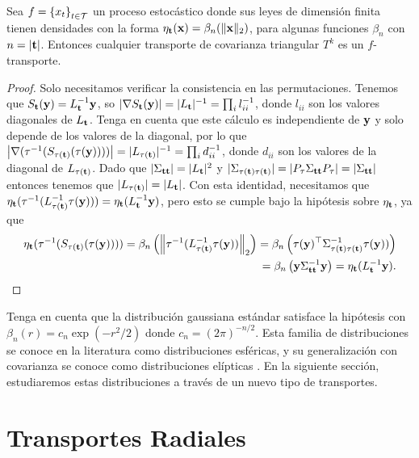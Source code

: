 \begin{proposition}
	Sea \(f=\left\{ x_{t}\right\} _{t\in \mathcal{T}}\) un proceso estocástico donde sus leyes de dimensión finita tienen densidades con la forma \(\eta_{\mathbf{t}}(\mathbf{x} ) = \beta_n(\lVert \mathbf{x} \rVert_2)\), para algunas funciones \(\beta_n\) con \(n = |\mathbf{t}|\). Entonces cualquier transporte de covarianza triangular \(T^k\) es un \(f\)-transporte.
	\begin{proof}
		Solo necesitamos verificar la consistencia en las permutaciones. Tenemos que \(S_{\mathbf{t}}(\mathbf{y})=L_{\mathbf{t}}^{-1}\mathbf{y}\), so \(|\nabla S_{\mathbf{t}}(\mathbf{y})| = |L_{\mathbf{t}}|^{-1} = \prod_{i} l_{ii}^{-1}\), donde \(l_{ii}\) son los valores diagonales de \(L_{\mathbf{t}}\). Tenga en cuenta que este cálculo es independiente de \(\mathbf{y}\) y solo depende de los valores de la diagonal, por lo que \(\left\vert \nabla( \tau^{-1}(S_{\tau(\mathbf{t})}(\tau(\mathbf{y})))) \right\vert = |L_{\tau(\mathbf{t})}|^{-1} =  \prod_{i} d_{ii}^{-1}\), donde \(d_{ii}\) son los valores de la diagonal de \(L_{\tau(\mathbf{t})}\). Dado que \(|\Sigma_{\mathbf{t}\mathbf{t}}| = |L_{\mathbf{t}}|^2\) y \(|\Sigma_{\tau(\mathbf{t})\tau(\mathbf{t})}| = |P_{\tau}\Sigma_{\mathbf{t}\mathbf{t}}P_{\tau}| = |\Sigma_{\mathbf{t}\mathbf{t}}|\) entonces tenemos que \(|L_{\tau(\mathbf{t})}| = |L_{\mathbf{t}}|\). Con esta identidad, necesitamos que \(\eta_{\mathbf{t}}(\tau^{-1}(L_{\tau(\mathbf{t})}^{-1}\tau(\mathbf{y})))  = \eta_{\mathbf{t}}(L_{\mathbf{t}}^{-1}\mathbf{y})\), pero esto se cumple bajo la hipótesis sobre \(\eta_{\mathbf{t}}\), ya que
		\begin{align*}
		\eta_{\mathbf{t}}(\tau^{-1}(S_{\tau(\mathbf{t})}(\tau(\mathbf{y})))) = \beta_n\left( \left\Vert \tau^{-1}(L_{\tau(\mathbf{t})}^{-1}\tau(\mathbf{y}))\right\Vert_2 \right) = \beta_n\left( \tau(\mathbf{y})^{\top}\Sigma_{\tau(\mathbf{t})\tau(\mathbf{t})}^{-1}\tau(\mathbf{y})) \right)\\ = \beta_n\left(\mathbf{y}\Sigma_{\mathbf{t}\mathbf{t}}^{-1}\mathbf{y}\right) = \eta_{\mathbf{t}}(L_{\mathbf{t}}^{-1}\mathbf{y}).
		\end{align*}
	\end{proof}
\end{proposition}

Tenga en cuenta que la distribución gaussiana estándar satisface la hipótesis con \(\beta_n(r)= c_n\exp(-r^2/2)\) donde \(c_n =(2\pi)^{-n/2}\). Esta familia de distribuciones se conoce en la literatura como distribuciones esféricas, y su generalización con covarianza se conoce como distribuciones elípticas \cite{owen1983class}. En la siguiente sección, estudiaremos estas distribuciones a través de un nuevo tipo de transportes.

\section{Transportes Radiales}
\label{sec:familytgp}


